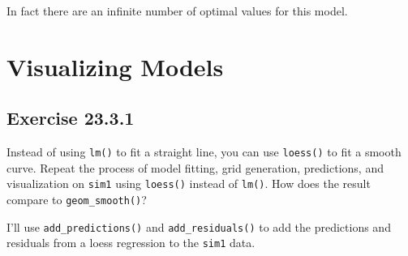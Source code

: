 \documentclass[]{book}
\newenvironment{Shaded}{\begin{snugshade}}{\end{snugshade}}
\newcommand{\CommentTok}[1]{\textcolor[rgb]{0.56,0.35,0.01}{\textit{#1}}}
\newcommand{\DataTypeTok}[1]{\textcolor[rgb]{0.13,0.29,0.53}{#1}}
\newcommand{\DecValTok}[1]{\textcolor[rgb]{0.00,0.00,0.81}{#1}}
\newcommand{\KeywordTok}[1]{\textcolor[rgb]{0.13,0.29,0.53}{\textbf{#1}}}
\newcommand{\NormalTok}[1]{#1}
\newcommand{\OperatorTok}[1]{\textcolor[rgb]{0.81,0.36,0.00}{\textbf{#1}}}
\newcommand{\StringTok}[1]{\textcolor[rgb]{0.31,0.60,0.02}{#1}}
\theoremstyle{plain}
\theoremstyle{remark}
\begin{document}
\begin{Shaded}
\end{Shaded}

\begin{Shaded}
\end{Shaded}

In fact there are an infinite number of optimal values for this model.

\hypertarget{visualizing-models}{%
\section{Visualizing Models}\label{visualizing-models}}

\hypertarget{exercise-23.3.1}{%
\subsection*{\texorpdfstring{Exercise
{23.3.1}}{Exercise 23.3.1}}\label{exercise-23.3.1}}

Instead of using \texttt{lm()} to fit a straight line, you can use
\texttt{loess()} to fit a smooth curve. Repeat the process of model
fitting, grid generation, predictions, and visualization on
\texttt{sim1} using \texttt{loess()} instead of \texttt{lm()}. How does
the result compare to \texttt{geom\_smooth()}?

I'll use \texttt{add\_predictions()} and \texttt{add\_residuals()} to
add the predictions and residuals from a loess regression to the
\texttt{sim1} data.
\end{document}
